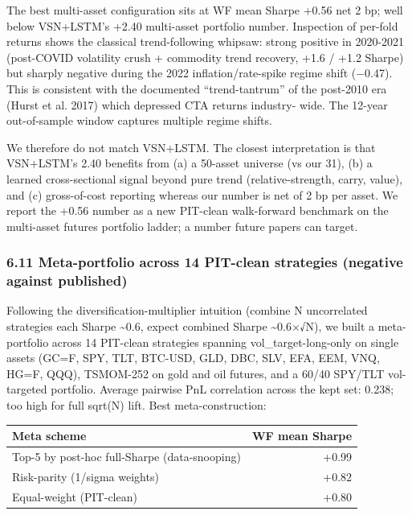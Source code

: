 \documentclass[
]{article}
\newcounter{none} %
\begin{document}
The best multi-asset configuration sits at WF mean Sharpe +0.56 net 2
bp; well below VSN+LSTM's +2.40 multi-asset portfolio number. Inspection
of per-fold returns shows the classical trend-following whipsaw: strong
positive in 2020-2021 (post-COVID volatility crush + commodity trend
recovery, +1.6 / +1.2 Sharpe) but sharply negative during the 2022
inflation/rate-spike regime shift (−0.47). This is consistent with the
documented ``trend-tantrum'' of the post-2010 era (Hurst et al. 2017)
which depressed CTA returns industry- wide. The 12-year out-of-sample
window captures multiple regime shifts.

We therefore do not match VSN+LSTM. The closest interpretation is that
VSN+LSTM's 2.40 benefits from (a) a 50-asset universe (vs our 31), (b) a
learned cross-sectional signal beyond pure trend (relative-strength,
carry, value), and (c) gross-of-cost reporting whereas our number is net
of 2 bp per asset. We report the +0.56 number as a new PIT-clean
walk-forward benchmark on the multi-asset futures portfolio ladder; a
number future papers can target.

\subsubsection{6.11 Meta-portfolio across 14 PIT-clean strategies
(negative against
published)}\label{meta-portfolio-across-14-pit-clean-strategies-negative-against-published}

Following the diversification-multiplier intuition (combine N
uncorrelated strategies each Sharpe \textasciitilde0.6, expect combined
Sharpe \textasciitilde0.6×√N), we built a meta-portfolio across 14
PIT-clean strategies spanning vol\_target-long-only on single assets
(GC=F, SPY, TLT, BTC-USD, GLD, DBC, SLV, EFA, EEM, VNQ, HG=F, QQQ),
TSMOM-252 on gold and oil futures, and a 60/40 SPY/TLT vol-targeted
portfolio. Average pairwise PnL correlation across the kept set: 0.238;
too high for full sqrt(N) lift. Best meta-construction:

{\def\LTcaptype{none} %
\begin{longtable}[]{@{}lr@{}}
\toprule\noalign{}
Meta scheme & WF mean Sharpe \\
\midrule\noalign{}
\endhead
\bottomrule\noalign{}
\endlastfoot
Top-5 by post-hoc full-Sharpe (data-snooping) & +0.99 \\
Risk-parity (1/sigma weights) & +0.82 \\
Equal-weight (PIT-clean) & +0.80 \\
\end{longtable}
}
\end{document}

